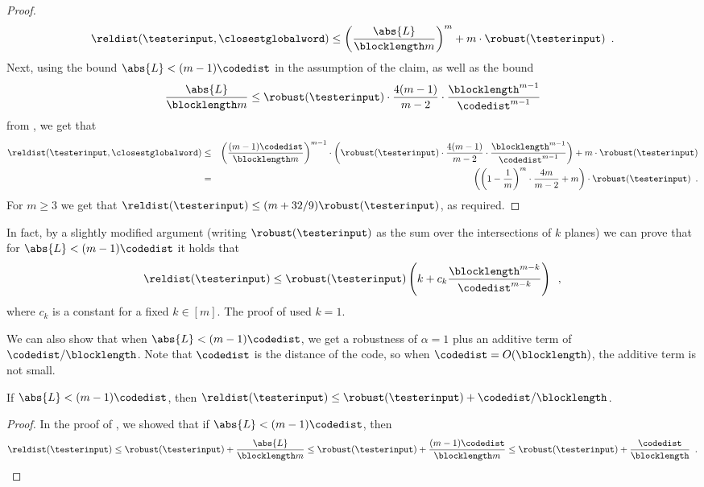\documentclass{toc}
\theoremstyle{plain}
\begin{document}
\begin{proof}
\begin{equation*}
  \reldist(\testerinput,\closestglobalword)
  \leq  \left(\frac{\abs{L}}{\blocklength m}\right)^m + m \cdot \robust(\testerinput)\enspace.
\end{equation*}
Next, using the bound $\abs{L} < (m-1)\codedist$ in the assumption of the claim,
as well as the bound
\[
  \frac{\abs{L}}{\blocklength m} \leq \robust(\testerinput) \cdot \frac{4(m-1)}{m-2} \cdot \frac{\blocklength^{m-1}}{\codedist^{m-1}}
\]
from , we get that
\begin{eqnarray*}
  \reldist(\testerinput,\closestglobalword)
  & \leq & \left(\frac{(m-1)\codedist}{\blocklength m}\right)^{m-1} \cdot
  \left( \robust(\testerinput) \cdot \frac{4(m-1)}{m-2} \cdot \frac{\blocklength^{m-1}}{\codedist^{m-1}} \right) + m \cdot \robust(\testerinput) \\
  & = & \left( \left(1  - \frac{1}{m}\right)^{m} \cdot \frac{4m}{m-2} + m \right) \cdot \robust(\testerinput) \enspace.
\end{eqnarray*}
For $m \geq 3$ we get that $\reldist(\testerinput) \leq (m + 32/9) \robust(\testerinput)$, as required.
\end{proof}

\begin{remark}
In fact, by a slightly modified argument (writing $\robust(\testerinput)$ as the sum over the intersections of $k$ planes) we can prove that for $\abs{L} < (m-1)\codedist$
it holds that
\[
  \reldist(\testerinput) \leq \robust(\testerinput) \left( k + c_k \frac{\blocklength^{m-k}}{\codedist^{m-k}}\right)\enspace,
\]
where $c_k$ is a constant for a fixed $k \in [m]$. The proof of  used $k = 1$.
\end{remark}

We can also show that when $\abs{L} < (m-1) \codedist$, we get a robustness of $\alpha = 1$ plus an additive term of $\codedist/\blocklength$. Note that $\codedist$ is the distance of the code, so when $\codedist = O(\blocklength)$, the additive term is not small.

\begin{claim}
If $\abs{L} < (m-1) \codedist$, then $\reldist(\testerinput) \leq \robust(\testerinput ) + \codedist/\blocklength$.
\end{claim}
\begin{proof}
In the proof of , we showed that if $\abs{L} < (m-1)\codedist$, then
\begin{equation*}
\reldist(\testerinput) \leq \robust(\testerinput) + \frac{\abs{L}}{\blocklength m} \leq  \robust(\testerinput) + \frac{(m-1)\codedist}{\blocklength m} \leq \robust(\testerinput) + \frac{\codedist}{\blocklength} \enspace. \qedhere
\end{equation*}
\end{proof}
\end{document}
